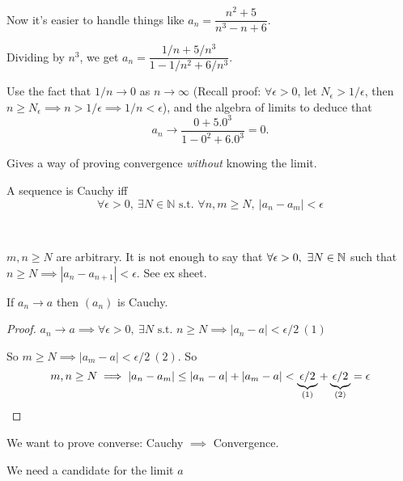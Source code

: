 \begin{remark}
 Now it's easier to handle things like $a_n = \dfrac{n^2 + 5}{n^3 - n + 6}$.

Dividing by $n^3$, we get $a_n = \dfrac{1/n + 5/n^3}{1 - 1/n^2 + 6/n^3}$.

 Use the fact that $1/n \to 0$ as $n \to \infty$ (Recall proof: $\forall \epsilon >0$, let $N_\epsilon  > 1/\epsilon$, then $n\geq N_{\epsilon} \implies n > 1/\epsilon \implies 1/n < \epsilon$), and the algebra of limits to deduce that 
\[a_n \to \dfrac{0 + 5.0^3}{1 - 0^2 + 6.0^3} = 0.\]
\end{remark}




Gives a way of proving convergence \emph{without} knowing the limit.\\

\begin{definition}
	A sequence is Cauchy iff
	\[\forall \epsilon >0,~\exists N \in \mathbb{N} \text{ s.t. } \forall n,m \geq N,~ |a_n - a_m| < \epsilon\]
\end{definition}~

\begin{remark}
$m,n \geq N$ are arbitrary. It is not enough to say that $\forall \epsilon >0,~\exists N \in \mathbb{N}$ such that $n \geq N \implies |a_n - a_{n+1}| < \epsilon$. See ex sheet. 	
\end{remark}

\begin{proposition}	
If $a_n \to a$ then $(a_n)$ is Cauchy. 
\end{proposition}
\begin{proof}
$a_n \to a\implies \forall \epsilon >0,~\exists N \text{ s.t. } n \geq N \implies |a_n - a| < \epsilon/2 ~(1)$


So $m \geq N \implies |a_m - a| < \epsilon /2 ~(2)$. So \[m,n \geq N \implies |a_n - a_m| \leq |a_n - a| + |a_m - a| < \underbrace{\epsilon/2}_{(1)} + \underbrace{\epsilon/2}_{(2)}=\epsilon\qedhere\]
\end{proof}

We want to prove converse: Cauchy $\implies$ Convergence.

We need a candidate for the limit $a$


